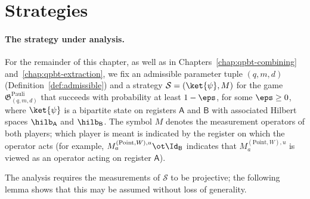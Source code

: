\section{Strategies}
\label{sec:commutation}

\paragraph{The strategy under analysis.}
For the remainder of this chapter, as well as in
Chapters~\ref{chap:qpbt-combining} and~\ref{chap:qpbt-extraction}, we fix
an admissible parameter tuple $(q,m,d)$
(Definition~\ref{def:admissible}) and a strategy
$\mathcal{S} = (\ket{\psi}, M)$ for the game
$\mathfrak{G}^{\mathrm{Pauli}}_{(q,m,d)}$ that succeeds with probability
at least $1 - \eps$, for some $\eps \geq 0$, where $\ket{\psi}$ is a
bipartite state on registers $\mathsf{A}$ and $\mathsf{B}$ with associated
Hilbert spaces $\hilb_{\mathsf{A}}$ and $\hilb_{\mathsf{B}}$. The symbol
$M$ denotes the measurement operators of both players; which player is
meant is indicated by the register on which the operator acts (for
example, $M^{(\mathrm{Point},W),u}_a \ot \Id_{\mathsf{B}}$ indicates that
$M^{(\mathrm{Point},W),u}_a$ is viewed as an operator acting on register
$\mathsf{A}$).

The analysis requires the measurements of $\mathcal{S}$ to be projective;
the following lemma shows that this may be assumed without loss of
generality.

